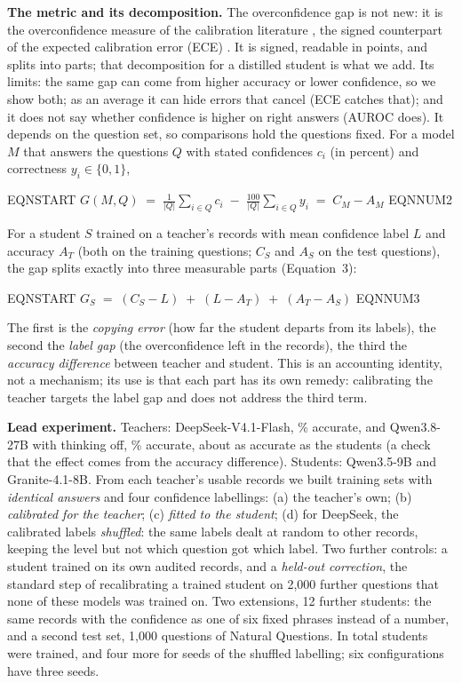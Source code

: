\documentclass[10pt]{article}
\begin{document}
\textbf{The metric and its decomposition.} The overconfidence gap is not new: it is the overconfidence measure of the calibration literature \cite{lf77,lichtenstein}, the signed counterpart of the expected calibration error (ECE) \cite{guo}. It is signed, readable in points, and splits into parts; that decomposition for a distilled student is what we add. Its limits: the same gap can come from higher accuracy or lower confidence, so we show both; as an average it can hide errors that cancel (ECE catches that); and it does not say whether confidence is higher on right answers (AUROC does). It depends on the question set, so comparisons hold the questions fixed. For a model $M$ that answers the questions $Q$ with stated confidences $c_i$ (in percent) and correctness $y_i\in\{0,1\}$,

EQNSTART $\displaystyle G(M,Q) \;=\; \frac{1}{|Q|}\sum_{i\in Q} c_i \;-\; \frac{100}{|Q|}\sum_{i\in Q} y_i \;=\; C_M - A_M$ EQNNUM2

For a student $S$ trained on a teacher's records with mean confidence label $L$ and accuracy $A_T$ (both on the training questions; $C_S$ and $A_S$ on the test questions), the gap splits exactly into three measurable parts (Equation~3):

EQNSTART $\displaystyle G_S \;=\; (C_S - L) \;+\; (L - A_T) \;+\; (A_T - A_S)$ EQNNUM3

The first is the \emph{copying error} (how far the student departs from its labels), the second the \emph{label gap} (the overconfidence left in the records), the third the \emph{accuracy difference} between teacher and student. This is an accounting identity, not a mechanism; its use is that each part has its own remedy: calibrating the teacher targets the label gap and does not address the third term.

\textbf{Lead experiment.} Teachers: DeepSeek-V4.1-Flash, \dTeacherAcc{}\% accurate, and Qwen3.8-27B with thinking off, \dMTeacherAcc{}\% accurate, about as accurate as the students (a check that the effect comes from the accuracy difference). Students: Qwen3.5-9B and Granite-4.1-8B. From each teacher's \dTeacherKept{} usable records we built training sets with \emph{identical answers} and four confidence labellings: (a) the teacher's own; (b) \emph{calibrated for the teacher}; (c) \emph{fitted to the student}; (d) for DeepSeek, the calibrated labels \emph{shuffled}: the same labels dealt at random to other records, keeping the level but not which question got which label. Two further controls: a student trained on its own audited records, and a \emph{held-out correction}, the standard step of recalibrating a trained student on 2{,}000 further questions that none of these models was trained on. Two extensions, 12 further students: the same records with the confidence as one of six fixed phrases instead of a number, and a second test set, 1{,}000 questions of Natural Questions. In total \dCells{} students were trained, and four more for seeds of the shuffled labelling; six configurations have three seeds.
\end{document}

